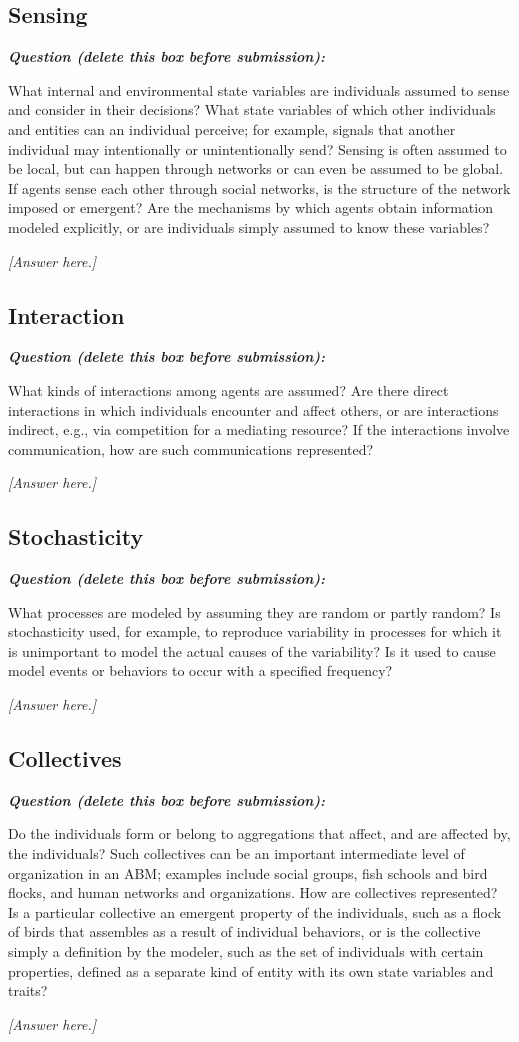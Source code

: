 \documentclass[11pt,a4paper]{article}
\newenvironment{question}
  {\begin{oddquestion}\small\itshape\color{oddquestioncolor}%
   \textbf{Question (delete this box before submission):}\par\smallskip}
  {\end{oddquestion}}
\begin{document}
\subsection{Sensing}
\begin{question}
What internal and environmental state variables are individuals assumed
to sense and consider in their decisions? What state variables of which
other individuals and entities can an individual perceive; for example,
signals that another individual may intentionally or unintentionally
send? Sensing is often assumed to be local, but can happen through
networks or can even be assumed to be global. If agents sense each other
through social networks, is the structure of the network imposed or
emergent? Are the mechanisms by which agents obtain information modeled
explicitly, or are individuals simply assumed to know these variables?
\end{question}
\textit{[Answer here.]}

\subsection{Interaction}
\begin{question}
What kinds of interactions among agents are assumed? Are there direct
interactions in which individuals encounter and affect others, or are
interactions indirect, e.g., via competition for a mediating resource?
If the interactions involve communication, how are such communications
represented?
\end{question}
\textit{[Answer here.]}

\subsection{Stochasticity}
\begin{question}
What processes are modeled by assuming they are random or partly random?
Is stochasticity used, for example, to reproduce variability in
processes for which it is unimportant to model the actual causes of the
variability? Is it used to cause model events or behaviors to occur with
a specified frequency?
\end{question}
\textit{[Answer here.]}

\subsection{Collectives}
\begin{question}
Do the individuals form or belong to aggregations that affect, and are
affected by, the individuals? Such collectives can be an important
intermediate level of organization in an ABM; examples include social
groups, fish schools and bird flocks, and human networks and
organizations. How are collectives represented? Is a particular
collective an emergent property of the individuals, such as a flock of
birds that assembles as a result of individual behaviors, or is the
collective simply a definition by the modeler, such as the set of
individuals with certain properties, defined as a separate kind of
entity with its own state variables and traits?
\end{question}
\textit{[Answer here.]}
\end{document}
